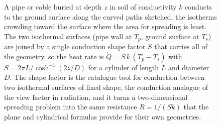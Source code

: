\begin{figure}[htbp]
\centering
{}
\caption[Conduction shape factor for a buried cylinder]{A pipe or cable
buried at depth $z$ in soil of conductivity $k$ conducts to the ground
surface along the curved paths sketched, the isotherms crowding toward the
surface where the area for spreading is least. The two isothermal surfaces
(pipe wall at $T_p$, ground surface at $T_s$) are joined by a single
conduction shape factor $S$ that carries all of the geometry, so the heat
rate is $\dot{Q} = S\,k\,(T_p - T_s)$ with $S = 2\pi L/\cosh^{-1}(2z/D)$
for a cylinder of length $L$ and diameter $D$. The shape factor is the
catalogue tool for conduction between two isothermal surfaces of fixed
shape, the conduction analogue of the view factor in radiation, and it
turns a two-dimensional spreading problem into the same resistance
$R = 1/(Sk)$ that the plane and cylindrical formulas provide for their
own geometries.}
\label{fig:vol04ch05:shape-factor-buried}
\end{figure}
